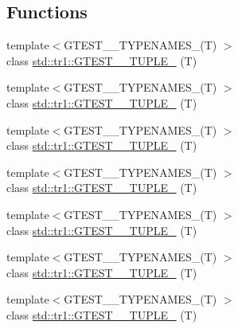 \subsection*{Functions}
\begin{DoxyCompactItemize}
\item 
{\footnotesize template$<$G\+T\+E\+S\+T\+\_\+\_\+\+T\+Y\+P\+E\+N\+A\+M\+E\+S\+\_\+(\+T) $>$ }\\class \mbox{\hyperlink{namespacestd_1_1tr1_a9971f52f994f142fe36c786b991cfd3e}{std\+::tr1\+::\+G\+T\+E\+S\+T\+\_\+\_\+\+T\+U\+P\+L\+E\+\_\+}} (T)
\item 
{\footnotesize template$<$G\+T\+E\+S\+T\+\_\+\_\+\+T\+Y\+P\+E\+N\+A\+M\+E\+S\+\_\+(\+T) $>$ }\\class \mbox{\hyperlink{namespacestd_1_1tr1_a05651180c3a4c06fe0f3b09144b82b93}{std\+::tr1\+::\+G\+T\+E\+S\+T\+\_\+\_\+\+T\+U\+P\+L\+E\+\_\+}} (T)
\item 
{\footnotesize template$<$G\+T\+E\+S\+T\+\_\+\_\+\+T\+Y\+P\+E\+N\+A\+M\+E\+S\+\_\+(\+T) $>$ }\\class \mbox{\hyperlink{namespacestd_1_1tr1_a368170c49cc7d7f130c0564bbad01205}{std\+::tr1\+::\+G\+T\+E\+S\+T\+\_\+\_\+\+T\+U\+P\+L\+E\+\_\+}} (T)
\item 
{\footnotesize template$<$G\+T\+E\+S\+T\+\_\+\_\+\+T\+Y\+P\+E\+N\+A\+M\+E\+S\+\_\+(\+T) $>$ }\\class \mbox{\hyperlink{namespacestd_1_1tr1_a661b17d2b7137863f06a016762f5c888}{std\+::tr1\+::\+G\+T\+E\+S\+T\+\_\+\_\+\+T\+U\+P\+L\+E\+\_\+}} (T)
\item 
{\footnotesize template$<$G\+T\+E\+S\+T\+\_\+\_\+\+T\+Y\+P\+E\+N\+A\+M\+E\+S\+\_\+(\+T) $>$ }\\class \mbox{\hyperlink{namespacestd_1_1tr1_a51b070e2eb5e6bb83a290f35c19667dd}{std\+::tr1\+::\+G\+T\+E\+S\+T\+\_\+\_\+\+T\+U\+P\+L\+E\+\_\+}} (T)
\item 
{\footnotesize template$<$G\+T\+E\+S\+T\+\_\+\_\+\+T\+Y\+P\+E\+N\+A\+M\+E\+S\+\_\+(\+T) $>$ }\\class \mbox{\hyperlink{namespacestd_1_1tr1_a485b05fdbbcfcf7ad5e4234e17702268}{std\+::tr1\+::\+G\+T\+E\+S\+T\+\_\+\_\+\+T\+U\+P\+L\+E\+\_\+}} (T)
\item 
{\footnotesize template$<$G\+T\+E\+S\+T\+\_\+\_\+\+T\+Y\+P\+E\+N\+A\+M\+E\+S\+\_\+(\+T) $>$ }\\class \mbox{\hyperlink{namespacestd_1_1tr1_ab451b390a95ee0555d7a43b67ea348aa}{std\+::tr1\+::\+G\+T\+E\+S\+T\+\_\+\_\+\+T\+U\+P\+L\+E\+\_\+}} (T)
\item 

\end{DoxyCompactItemize}
